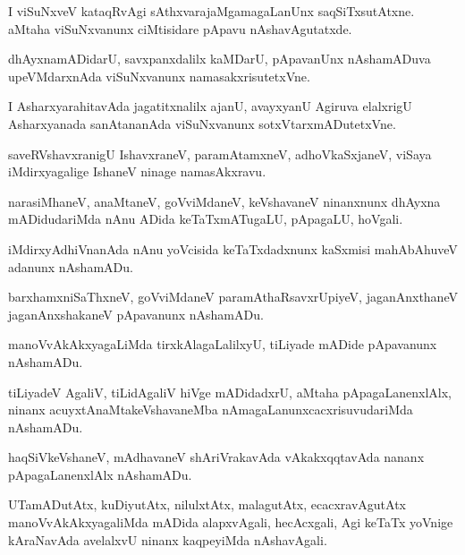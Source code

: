 \documentclass{article}
\begin{document}
\begin{mn}%
I viSuNxveV kataqRvAgi sAthxvarajaMgamagaLanUnx saqSiTxsutAtxne. aMtaha viSuNxvanunx 
ciMtisidare pApavu nAshavAgutatxde.
\end{mn}

\begin{mn}%
dhAyxnamADidarU, savxpanxdalilx kaMDarU, pApavanUnx nAshamADuva upeVMdarxnAda viSuNxvanunx 
namasakxrisutetxVne.
\end{mn}

\begin{mn}%
I AsharxyarahitavAda jagatitxnalilx ajanU, avayxyanU Agiruva elalxrigU Asharxyanada 
sanAtananAda viSuNxvanunx sotxVtarxmADutetxVne.
\end{mn}

\begin{mn}%
saveRVshavxranigU IshavxraneV, paramAtamxneV, adhoVkaSxjaneV, viSaya iMdirxyagalige 
IshaneV ninage namasAkxravu.
\end{mn}

\begin{mn}%
narasiMhaneV, anaMtaneV, goVviMdaneV, keVshavaneV ninanxnunx dhAyxna mADidudariMda nAnu 
ADida keTaTxmATugaLU, pApagaLU, hoVgali.
\end{mn}

\begin{mn}%
iMdirxyAdhiVnanAda nAnu yoVcisida keTaTxdadxnunx kaSxmisi mahAbAhuveV adanunx nAshamADu.
\end{mn}

\begin{mn}%
barxhamxniSaThxneV, goVviMdaneV paramAthaRsavxrUpiyeV, jaganAnxthaneV jaganAnxshakaneV 
pApavanunx nAshamADu.
\end{mn}

\begin{mn}%
manoVvAkAkxyagaLiMda tirxkAlagaLalilxyU, tiLiyade mADide pApavanunx nAshamADu.
\end{mn}

\begin{mn}%
tiLiyadeV AgaliV, tiLidAgaliV hiVge mADidadxrU, aMtaha pApagaLanenxlAlx, ninanx 
acuyxtAnaMtakeVshavaneMba nAmagaLanunxcacxrisuvudariMda nAshamADu.
\end{mn}

\begin{mn}%
haqSiVkeVshaneV, mAdhavaneV shAriVrakavAda vAkakxqqtavAda nananx pApagaLanenxlAlx nAshamADu.
\end{mn}

\begin{mn}%
UTamADutAtx, kuDiyutAtx, nilulxtAtx, malagutAtx, ecacxravAgutAtx manoVvAkAkxyagaliMda 
mADida alapxvAgali, hecAcxgali, Agi keTaTx yoVnige kAraNavAda avelalxvU ninanx kaqpeyiMda 
nAshavAgali.
\end{mn}
\end{document}
